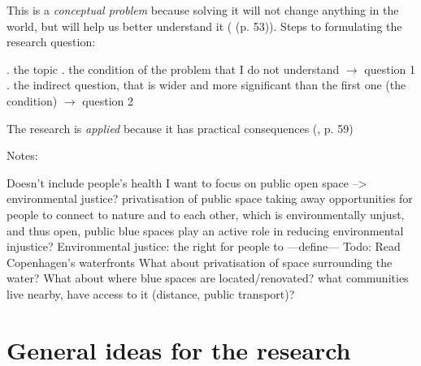 \documentclass{article}
\begin{document}
This is a \textit{conceptual problem} because solving it will not change anything in the world, but will help us better understand it (\cite{booth2003craft} (p. 53)). Steps to formulating the research question:

\begin{outline}
	. the topic
	. the condition of the problem that I do not understand $\rightarrow$ question 1
	. the indirect question, that is wider and more significant than the first one (the condition) $\rightarrow$ question 2
\end{outline}
	
The research is \textit{applied} because it has practical consequences (\cite{booth2003craft}, p. 59)

Notes:

\begin{outline}
	\1 Doesn't include people's health
	\1 I want to focus on public open space --> environmental justice? privatisation of public space taking away opportunities for people to connect to nature and to each other, which is environmentally unjust, and thus open, public blue spaces play an active role in reducing environmental injustice? 
	\1 Environmental justice: the right for people to ---define---
	\1 Todo:
		\2 Read Copenhagen's waterfronts
	\1 What about privatisation of space surrounding the water?
	\1 What about where blue spaces are located/renovated? what communities live nearby, have access to it (distance, public transport)?
\end{outline}

\section{General ideas for the research}
\end{document}
